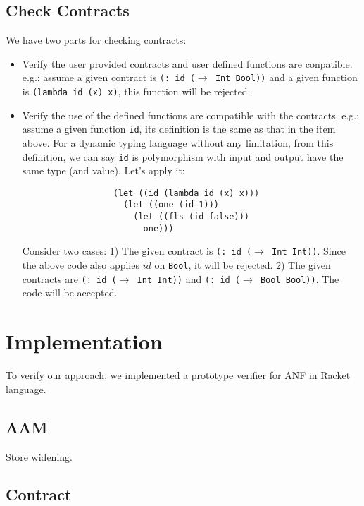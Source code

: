 \documentclass[paper=a4, fontsize=11pt]{scrartcl} %
\numberwithin{equation}{section} %
\numberwithin{figure}{section} %
\numberwithin{table}{section} %
\begin{document}
\subsection{Check Contracts}
We have two parts for checking contracts:
\begin{itemize}
\item Verify the user provided contracts and user defined functions are conpatible. e.g.: assume a given contract is \texttt{(: id ($\rightarrow$ Int Bool))} and a given function is \texttt{(lambda\ id\ (x)\ x)}, this function will be rejected.

\item Verify the use of the defined functions are compatible with the contracts. e.g.: assume a given function \texttt{id}, its definition is the same as that in the item above. For a dynamic typing language without any limitation, from this definition, we can say \texttt{id} is polymorphism with input and output have the same type (and value). Let's apply it:
\begin{verbatim}
                  (let ((id (lambda id (x) x)))
                    (let ((one (id 1)))
                      (let ((fls (id false)))
                        one)))
\end{verbatim}
Consider two cases: 1) The given contract is \texttt{(: id ($\rightarrow$ Int Int))}. Since the above code also applies $id$ on \texttt{Bool}, it will be rejected. 2) The given contracts are \texttt{(: id ($\rightarrow$ Int Int))} and \texttt{(: id ($\rightarrow$ Bool Bool))}. The code will be accepted. 
\end{itemize}



\section{Implementation}

To verify our approach, we implemented a prototype verifier for ANF in Racket language.

\subsection{AAM}
Store widening.

\subsection{Contract}
\end{document}
